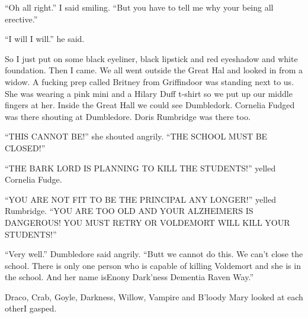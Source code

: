 \enquote{Oh all right.} I said smiling. \enquote{But you have to tell me why your being all erective.}

\enquote{I will I will.} he said.

So I just put on some black eyeliner, black lipstick and red eyeshadow and white foundation. Then I came. We all went outside the Great Hal and looked in from a widow. A fucking prep called Britney from Griffindoor was standing next to us. She was wearing a pink mini and a Hilary Duff t-shirt so we put up our middle fingers at her. Inside the Great Hall we could see Dumbledork. Cornelia Fudged was there shouting at Dumbledore. Doris Rumbridge was there too.

\enquote{THIS CANNOT BE\@!} she shouted angrily. \enquote{THE SCHOOL MUST BE CLOSED\@!}

\enquote{THE BARK LORD IS PLANNING TO KILL THE STUDENTS\@!} yelled Cornelia Fudge.

\begin{sloppypar}
    \enquote{YOU ARE NOT FIT TO BE THE PRINCIPAL ANY LONGER\@!} yelled Rumbridge. \enquote{YOU ARE TOO OLD AND YOUR ALZ\-HEIMERS IS DANGEROUS\@! YOU MUST RETRY OR VOL\-DE\-MORT WILL KILL YOUR STUDENTS\@!}
\end{sloppypar}

\enquote{Very well.} Dumbledore said angrily. \enquote{Butt we cannot do this. We can't close the school. There is only one person who is capable of killing Voldemort and she is in the school. And her name is\dotfill\newline\phantom{}\dotfill Enony Dark'ness Dementia Raven Way.} 

Draco, Crab, Goyle, Darkness, Willow, Vampire and B'loody Mary looked at each other\dotfill I gasped.

